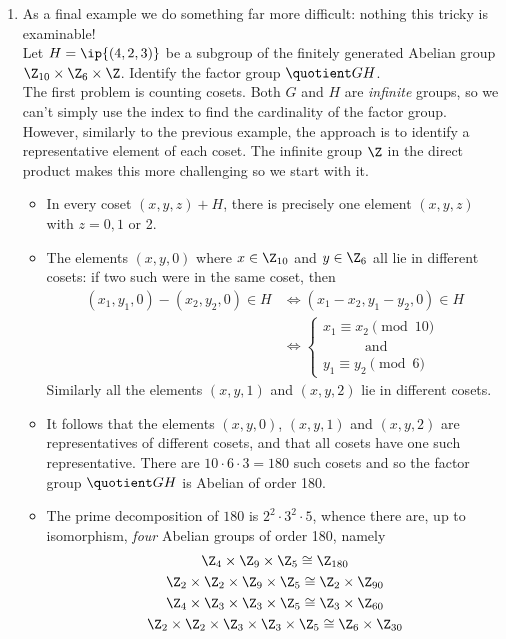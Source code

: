 \begin{enumerate}
\item As a final example we do something far more difficult: nothing this tricky is examinable!\\
Let $H=\ip{(4,2,3)}$ be a subgroup of the finitely generated Abelian group $\Z_{10}\times\Z_6\times\Z$. Identify the factor group $\quotient GH$.\\
The first problem is counting cosets. Both $G$ and $H$ are \emph{infinite} groups, so we can't simply use the index to find the cardinality of the factor group. However, similarly to the previous example, the approach is to identify a representative element of each coset. The infinite group $\Z$ in the direct product makes this more challenging so we start with it.
\begin{itemize}
  \item In every coset $(x,y,z)+H$, there is precisely one element $(x,y,z)$ with $z=0,1$ or 2.
  \item The elements $(x,y,0)$ where $x\in\Z_{10}$ and $y\in\Z_6$ all lie in different cosets: if two such were in the same coset, then
  \begin{align*}
  (x_1,y_1,0)-(x_2,y_2,0)\in H&\iff (x_1-x_2,y_1-y_2,0)\in H\\
  &\iff\begin{cases}
  x_1\equiv x_2\pmod{10}\\
  \qquad\quad\text{and}\\
  y_1\equiv y_2\pmod{6}
  \end{cases}
  \end{align*}
  Similarly all the elements $(x,y,1)$ and $(x,y,2)$ lie in different cosets.
  \item It follows that the elements $(x,y,0)$, $(x,y,1)$ and $(x,y,2)$ are representatives of different cosets, and that all cosets have one such representative. There are $10\cdot 6\cdot 3=180$ such cosets and so the factor group $\quotient GH$ is Abelian of order 180.
  \item The prime decomposition of $180$ is $2^2\cdot 3^2\cdot 5$, whence there are, up to isomorphism, \emph{four} Abelian groups of order 180, namely
  \begin{gather*}
  \Z_4\times\Z_9\times\Z_5\cong\Z_{180}\\
  \Z_2\times\Z_2\times\Z_9\times\Z_5\cong\Z_2\times\Z_{90}\\
  \Z_4\times\Z_3\times\Z_3\times\Z_5\cong\Z_3\times\Z_{60}\\
  \Z_2\times\Z_2\times\Z_3\times\Z_3\times\Z_5\cong\Z_6\times\Z_{30}
  \end{gather*}

\end{itemize}
\end{enumerate}
